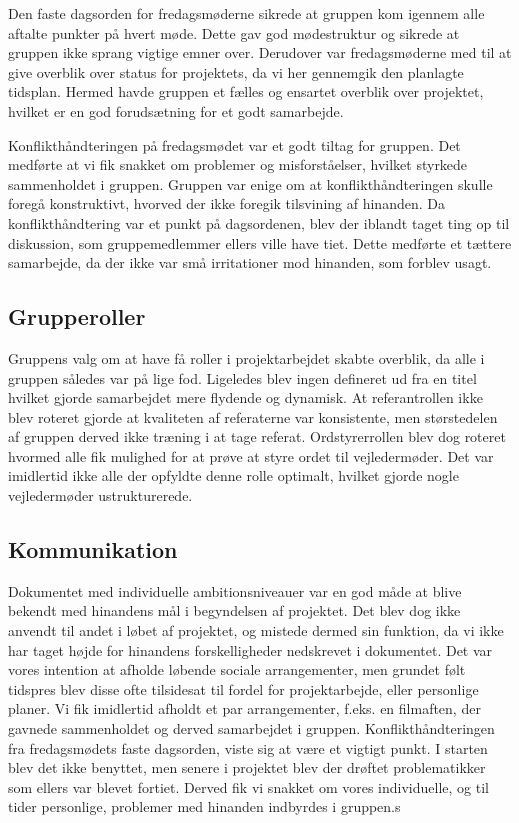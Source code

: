 Den faste dagsorden for fredagsmøderne sikrede at gruppen kom igennem alle aftalte punkter på hvert møde. Dette gav god mødestruktur og sikrede at gruppen ikke sprang vigtige emner over. Derudover var fredagsmøderne med til at give overblik over status for projektets, da vi her gennemgik den planlagte tidsplan. Hermed havde gruppen et fælles og ensartet overblik over projektet, hvilket er en god forudsætning for et godt samarbejde. 

Konflikthåndteringen på fredagsmødet var et godt tiltag for gruppen. Det medførte at vi fik snakket om problemer og misforståelser, hvilket styrkede sammenholdet i gruppen. Gruppen var enige om at konflikthåndteringen skulle foregå konstruktivt, hvorved der ikke foregik tilsvining af hinanden. Da konflikthåndtering var et punkt på dagsordenen, blev der iblandt taget ting op til diskussion, som gruppemedlemmer ellers ville have tiet. Dette medførte et tættere samarbejde, da der ikke var små irritationer mod hinanden, som forblev usagt. 

\subsection{Grupperoller}
Gruppens valg om at have få roller i projektarbejdet skabte overblik, da alle i gruppen således var på lige fod. Ligeledes blev ingen defineret ud fra en titel hvilket gjorde samarbejdet mere flydende og dynamisk. At referantrollen ikke blev roteret gjorde at kvaliteten af referaterne var konsistente, men størstedelen af gruppen derved ikke træning i at tage referat. Ordstyrerrollen blev dog roteret hvormed alle fik mulighed for at prøve at styre ordet til vejledermøder. Det var imidlertid ikke alle der opfyldte denne rolle optimalt, hvilket gjorde nogle vejledermøder ustrukturerede. 

\subsection{Kommunikation}
Dokumentet med individuelle ambitionsniveauer var en god måde at blive bekendt med hinandens mål i begyndelsen af projektet. Det blev dog ikke anvendt til andet i løbet af projektet, og mistede dermed sin funktion, da vi ikke har taget højde for hinandens forskelligheder nedskrevet i dokumentet. 
Det var vores intention at afholde løbende sociale arrangementer, men grundet følt tidspres blev disse ofte tilsidesat til fordel for projektarbejde, eller personlige planer. Vi fik imidlertid afholdt et par arrangementer, f.eks. en filmaften, der gavnede sammenholdet og derved samarbejdet i gruppen. 
Konflikthåndteringen fra fredagsmødets faste dagsorden, viste sig at være et vigtigt punkt. I starten blev det ikke benyttet, men senere i projektet blev der drøftet problematikker som ellers var blevet fortiet. Derved fik vi snakket om vores individuelle, og til tider personlige, problemer med hinanden indbyrdes i gruppen.s
